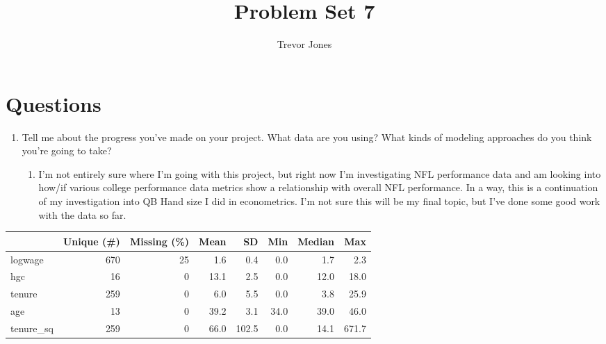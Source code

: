 \documentclass{article}
\title{Problem Set 7}
\author{Trevor Jones}
\begin{document}
\maketitle

\section{Questions}
\begin{enumerate}
    \item Tell me about the progress you’ve made on your project. What data are you using? What kinds of modeling approaches do you think you’re going to take?
    \begin{enumerate}
        \item I'm not entirely sure where I'm going with this project, but right now I'm investigating NFL performance data and am looking into how/if various college performance data metrics show a relationship with overall NFL performance. In a way, this is a continuation of my investigation into QB Hand size I did in econometrics. I'm not sure this will be my final topic, but I've done some good work with the data so far.  
    \end{enumerate}
\end{enumerate}
\pagebreak


\begin{table}
\centering
\begin{tabular}[t]{lrrrrrrr}
\toprule
  & Unique (\#) & Missing (\%) & Mean & SD & Min & Median & Max\\
\midrule
logwage & 670 & 25 & \num{1.6} & \num{0.4} & \num{0.0} & \num{1.7} & \num{2.3}\\
hgc & 16 & 0 & \num{13.1} & \num{2.5} & \num{0.0} & \num{12.0} & \num{18.0}\\
tenure & 259 & 0 & \num{6.0} & \num{5.5} & \num{0.0} & \num{3.8} & \num{25.9}\\
age & 13 & 0 & \num{39.2} & \num{3.1} & \num{34.0} & \num{39.0} & \num{46.0}\\
tenure\_sq & 259 & 0 & \num{66.0} & \num{102.5} & \num{0.0} & \num{14.1} & \num{671.7}\\
\bottomrule
\end{tabular}
\end{table}
\end{document}

